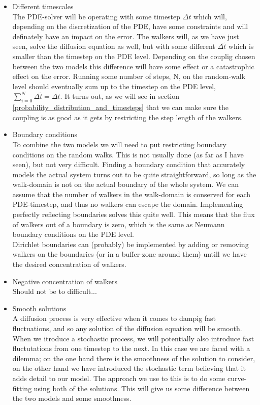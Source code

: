 \begin{itemize}
 \item Different timescales\\
  The PDE-solver will be operating with some timestep $\Delta t$ which will, depending on the discretization of the PDE, have some constraints and will definately have an impact on the error. 
  The walkers will, as we have just seen, solve the diffusion equation as well, but with some different $\Delta \tilde{t}$ which is smaller than the timestep on the PDE level. 
  Depending on the couplig chosen between the two models this difference will have some effect or a catastrophic effect on the error. 
  Running some number of steps, N, on the random-walk level should eventually sum up to the timestep on the PDE level, $\sum\limits_{i=0}^N \Delta\tilde{t} = \Delta t$. 
  It turns out, as we will see in section \ref{probability_distribution_and_timesteps} that we can make sure the coupling is as good as it gets by restricting the step length of the walkers.
 \item Boundary conditions\\
 To combine the two models we will need to put restricting boundary conditions on the random walks. This is not usually done (as far as I have seen), but not very difficult. 
 Finding a boundary condition that accurately models the actual system turns out to be quite straightforward, so long as the walk-domain is not on the actual boundary of the whole system. 
 We can assume that the number of walkers in the walk-domain is conserved for each PDE-timestep, and thus no walkers can escape the domain. 
 Implementing perfectly reflecting boundaries solves this quite well. 
 This means that the flux of walkers out of a boundary is zero, which is the same as Neumann boundary conditions on the PDE level. \\
 Dirichlet boundaries can (probably) be implemented by adding or removing walkers on the boundaries (or in a buffer-zone around them) untill we have the desired concentration of walkers.
 \item Negative concentration of walkers \\
 Should not be to difficult...
 \item Smooth solutions\\
 A diffusion process is very effective when it comes to dampig fast fluctuations, and so any solution of the diffusion equation will be smooth. 
 When we itroduce a stochastic process, we will potentially also introduce fast fluctutations from one timestep to the next. 
 In this case we are faced with a dilemma; on the one hand there is the smoothness of the solution to consider, on the other hand we have introduced the stochastic term believing that it adds detail to our model. 
 The approach we use to this is to do some curve-fitting using both of the solutions. 
 This will give us some difference between the two models and some smoothness.

\end{itemize}

